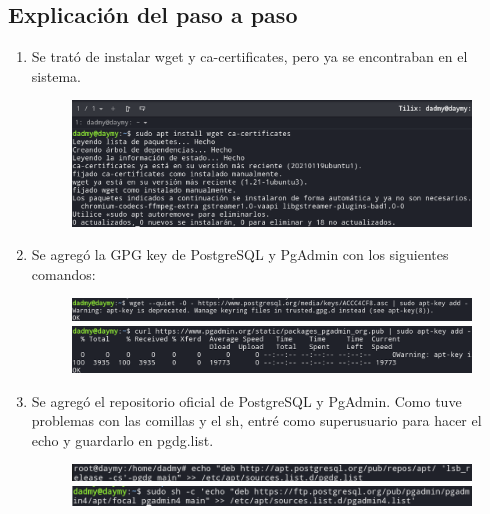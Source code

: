 \documentclass{exam}
\begin{document}
\subsection*{Explicación del paso a paso}
\begin{enumerate}
\item Se trató de instalar wget y ca-certificates, pero ya se encontraban en el sistema.\\

\begin{figure}[h]
	\centering
    \includegraphics[width = 15cm]{imgNolasco/1.png}
\end{figure}


\newpage
\item Se agregó la GPG key de PostgreSQL y PgAdmin con los siguientes comandos:
\begin{figure}[h]
	\centering
    \includegraphics[width = 15cm]{imgNolasco/2.png}
    \includegraphics[width = 15cm]{imgNolasco/3.png}
\end{figure}


\item Se agregó el repositorio oficial de PostgreSQL y PgAdmin. Como tuve problemas con las comillas y el sh, entré como superusuario para hacer el echo y guardarlo en pgdg.list.
\begin{figure}[h]
	\centering
    \includegraphics[width = 15cm]{imgNolasco/4.png}
    \includegraphics[width = 15cm]{imgNolasco/5.png}
\end{figure}



\end{enumerate}
\end{document}
